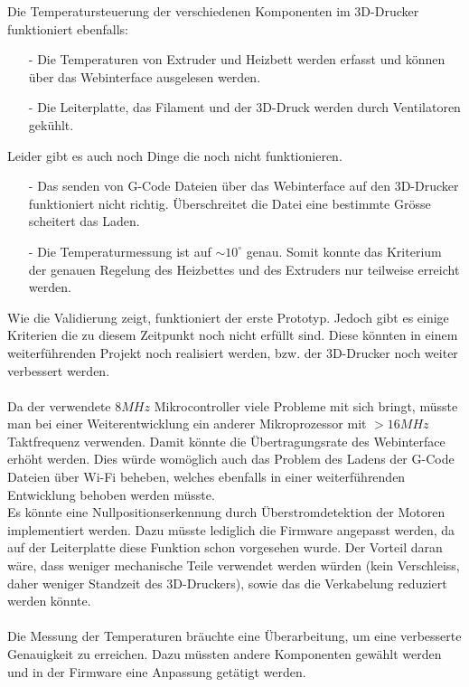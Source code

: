 Die Temperatursteuerung der verschiedenen Komponenten im 3D-Drucker funktioniert ebenfalls:

\begin{itemize}
	\item[-] Die Temperaturen von Extruder und Heizbett werden erfasst und können über das Webinterface ausgelesen werden.
	\item[-] Die Leiterplatte, das Filament und der 3D-Druck werden durch Ventilatoren gekühlt.
\end{itemize}

Leider gibt es auch noch Dinge die noch nicht funktionieren.

\begin{itemize}
	\item[-] Das senden von G-Code Dateien über das Webinterface auf den 3D-Drucker funktioniert nicht richtig. Überschreitet die Datei eine bestimmte Grösse scheitert das Laden.
	\item[-] Die Temperaturmessung ist auf $\sim 10^{\circ}$ genau. Somit konnte das Kriterium der genauen Regelung des Heizbettes und des Extruders nur teilweise erreicht werden. 
\end{itemize}

Wie die Validierung zeigt, funktioniert der erste Prototyp. Jedoch gibt es einige Kriterien die zu diesem Zeitpunkt noch nicht erfüllt sind. Diese könnten in einem weiterführenden Projekt noch realisiert werden, bzw. der 3D-Drucker noch weiter verbessert werden.\\
\\
Da der verwendete $8MHz$ Mikrocontroller viele Probleme mit sich bringt, müsste man bei einer Weiterentwicklung ein anderer Mikroprozessor mit $>16MHz$ Taktfrequenz verwenden. Damit könnte die Übertragungsrate des Webinterface erhöht werden. Dies würde womöglich auch das Problem des Ladens der G-Code Dateien über Wi-Fi beheben, welches ebenfalls in einer weiterführenden Entwicklung behoben werden müsste.
\\
Es könnte eine Nullpositionserkennung durch Überstromdetektion der Motoren implementiert werden. Dazu müsste lediglich die Firmware angepasst werden, da auf der Leiterplatte diese Funktion schon vorgesehen wurde. Der Vorteil daran wäre, dass weniger mechanische Teile verwendet werden würden (kein Verschleiss, daher weniger Standzeit des 3D-Druckers), sowie das die Verkabelung reduziert werden könnte.
\\
\\
Die Messung der Temperaturen bräuchte eine Überarbeitung, um eine verbesserte Genauigkeit zu erreichen. Dazu müssten andere Komponenten gewählt werden und in der Firmware eine Anpassung getätigt werden.





